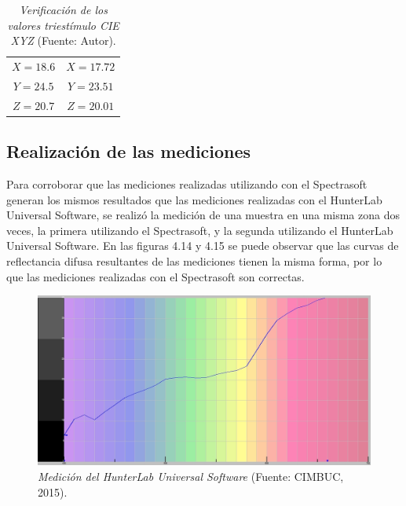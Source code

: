 	\begin{table}[h]
		\small
		\caption[Verificaci\'{o}n de los valores triest\'{i}mulo CIE XYZ]{\textit{Verificaci\'{o}n de los valores triest\'{i}mulo CIE XYZ} (Fuente: Autor).}
		\centering
		\setlength{\extrarowheight}{\altocelda}
		\begin{tabulary}{\anchotabla}{|c|c|}
			\hline
			 & \\ \hline
			$X = 18.6$ & $X = 17.72$\\ \hline
			$Y = 24.5$ & $Y = 23.51$\\ \hline
			$Z = 20.7$ & $Z = 20.01$\\ \hline
		\end{tabulary}
	\end{table}
	
	\subsection{Realizaci\'{o}n de las mediciones}
		Para corroborar que las mediciones realizadas utilizando con el Spectrasoft generan los mismos resultados que las mediciones realizadas con el HunterLab Universal Software, se realiz\'{o} la medici\'{o}n de una muestra en una misma zona dos veces, la primera utilizando el Spectrasoft, y la segunda utilizando el HunterLab Universal Software. En las figuras 4.14 y 4.15 se puede observar que las curvas de reflectancia difusa resultantes de las mediciones tienen la misma forma, por lo que las mediciones realizadas con el Spectrasoft son correctas.
	\newpage
		
 	\begin{figure}[H]
		\centering
		\includegraphics[scale=0.45]{img/medicion-hunterlab.jpg}
			\caption[Medici\'{o}n del HunterLab Universal Software]{\textit{Medici\'{o}n del HunterLab Universal Software} (Fuente: CIMBUC, 2015).}
	\end{figure}	
	
